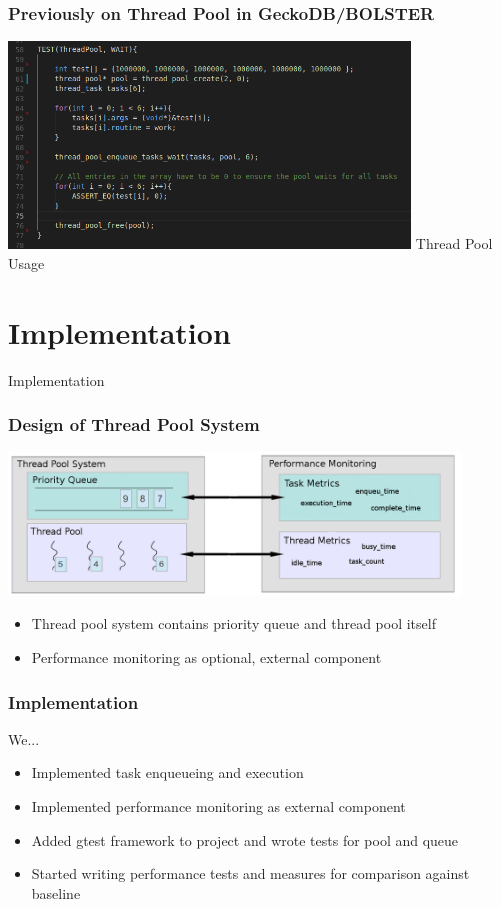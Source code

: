 \documentclass{beamer}
\begin{document}
\begin{frame}
	\frametitle{Previously on Thread Pool in GeckoDB/BOLSTER}
	\begin{center}
		\includegraphics[width=0.8\textwidth]{img/thread_pool_use.png}
		Thread Pool Usage
	\end{center}
\end{frame}

\section{Implementation}
\begin{frame}
	\begin{center}
		\huge Implementation
	\end{center}
\end{frame}

\begin{frame}
	\frametitle{Design of Thread Pool System}
	\begin{center}
		\includegraphics[width=0.9\textwidth]{img/pool_structure.png}
	\end{center}
	\begin{itemize}
		\item Thread pool system contains priority queue and thread pool itself
		\item Performance monitoring as optional, external component
	\end{itemize}
\end{frame}

\begin{frame}
	\frametitle{Implementation}
	We...
	\begin{itemize}
		\item Implemented task enqueueing and execution
		\item Implemented performance monitoring as external component
		\item Added gtest framework to project and wrote tests for pool and queue
		\item Started writing performance tests and measures for comparison against baseline
	\end{itemize}
\end{frame}
\end{document}
